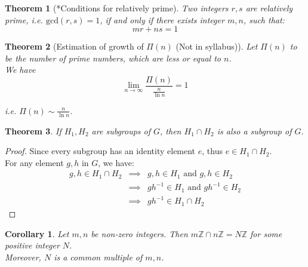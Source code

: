 \documentclass{article}
\theoremstyle{MyNonumberplain}
\theoremstyle{break}
\newtheorem*{proof}{Proof. }
\newcommand{\Z}{\mathbb{Z}}
\newcommand{\infixand}{\text{ and }}
\theoremstyle{break}
\newtheorem{theorem}{Theorem}[section]
\newtheorem{corollary}{Corollary}[theorem]
\theoremstyle{break}
\theoremstyle{definition}
\theoremstyle{break}
\begin{document}
\begin{thmbox}
    \begin{theorem}[*Conditions for relatively prime]
        Two integers $r,s$ are relatively prime, i.e. $\text{gcd}(r,s)=1$, if and only if there exists integer $m,n$, such that:
        $$mr+ns=1$$
    \end{theorem}
\end{thmbox}

\begin{thmbox}
    \begin{theorem}[Estimation of growth of $\Pi(n)$ (Not in syllabus)]
        Let $\Pi (n)$ to be the number of prime numbers, which are less or equal to $n$.\\
        
        We have
        \[ \lim_{n \rightarrow \infty} \frac{\Pi (n)}{\frac{n}{\ln n}} = 1 \]

        i.e. $\Pi (n) \sim \frac{n}{\ln n}$.
    \end{theorem}
\end{thmbox}

\begin{thmbox}
    \begin{theorem}
        If $H_1,H_2$ are subgroups of $G$, then $H_1\cap H_2$ is also a subgroup of $G$. 
    \end{theorem}
    \begin{prfbox}
        \begin{proof}
            Since every subgroup has an identity element $e$, thus $e\in H_1\cap H_2$.\\
            For any element $g,h$ in $G$, we have:
            \begin{eqnarray*}
                g,h\in H_1\cap H_2 & \implies & g,h\in H_1 \infixand g,h\in H_2 \\ 
                                   & \implies & gh^{-1}\in H_1 \infixand gh^{-1}\in H_2\\
                                   & \implies & gh^{-1}\in H_1\cap H_2
            \end{eqnarray*}
        \end{proof}
    \end{prfbox}
\end{thmbox}

\begin{thmbox}
    \begin{corollary}
        Let $m,n$ be non-zero integers. Then $m\Z\cap n\Z=N\Z$ for some positive integer $N$.\\

        Moreover, $N$ is a common multiple of $m,n$.
    \end{corollary}    
\end{thmbox}
\end{document}
